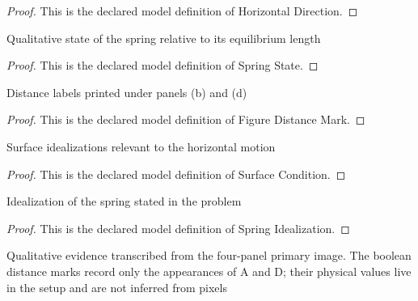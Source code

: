 \begin{proof}
  This is the declared model definition of Horizontal Direction.
\end{proof}
\begin{definition}
  \label{def:physics:phyx-mini-0236:phyxminiproblems-problemphyxmini0236-springstate}
  Qualitative state of the spring relative to its equilibrium length
\end{definition}
\begin{proof}
  This is the declared model definition of Spring State.
\end{proof}
\begin{definition}
  \label{def:physics:phyx-mini-0236:phyxminiproblems-problemphyxmini0236-figuredistancemark}
  Distance labels printed under panels (b) and (d)
\end{definition}
\begin{proof}
  This is the declared model definition of Figure Distance Mark.
\end{proof}
\begin{definition}
  \label{def:physics:phyx-mini-0236:phyxminiproblems-problemphyxmini0236-surfacecondition}
  Surface idealizations relevant to the horizontal motion
\end{definition}
\begin{proof}
  This is the declared model definition of Surface Condition.
\end{proof}
\begin{definition}
  \label{def:physics:phyx-mini-0236:phyxminiproblems-problemphyxmini0236-springidealization}
  Idealization of the spring stated in the problem
\end{definition}
\begin{proof}
  This is the declared model definition of Spring Idealization.
\end{proof}
\begin{definition}
  \label{def:physics:phyx-mini-0236:phyxminiproblems-problemphyxmini0236-twoblockspringfigure}
  Qualitative evidence transcribed from the four-panel primary image. The boolean distance marks record only the appearances of A and D; their physical values live in the setup and are not inferred from pixels
\end{definition}
